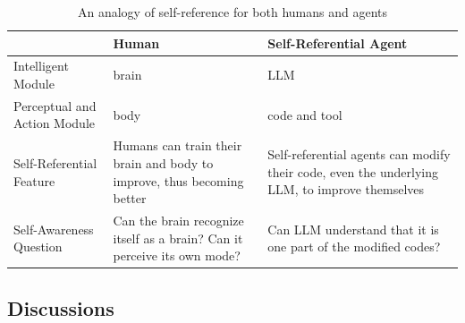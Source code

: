 \documentclass[11pt]{article}
\begin{document}
\begin{table}[t]
\centering

\begin{tabularx}{\textwidth}{@{}lL L@{}} %
\toprule
                          & \textbf{Human}                                                                         & \textbf{Self-Referential Agent}                                                                 \\ \midrule
Intelligent Module        & brain                                                                                  & LLM                                                                                             \\
Perceptual and Action Module    & body                                                                                   & code and tool                                                                                   \\
Self-Referential Feature  & Humans can train their brain and body to improve, thus becoming better                 & Self-referential agents can modify their code, even the underlying LLM, to improve themselves \\
Self-Awareness Question           & Can the brain recognize itself as a brain? Can it perceive its own mode?               & Can LLM understand that it is one part of the modified codes?                               \\ \bottomrule
\end{tabularx}
\caption{An analogy of self-reference for both humans and agents}
\label{tab:self_reference_analogy}
\end{table}


\subsection{Discussions}
\end{document}
